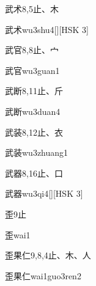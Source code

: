 \begin{entry}{武术}{8,5}{⽌、⽊}
  \begin{phonetics}{武术}{wu3shu4}[][HSK 3]
  \end{phonetics}
\end{entry}

\begin{entry}{武官}{8,8}{⽌、⼧}
  \begin{phonetics}{武官}{wu3guan1}
  \end{phonetics}
\end{entry}

\begin{entry}{武断}{8,11}{⽌、⽄}
  \begin{phonetics}{武断}{wu3duan4}
  \end{phonetics}
\end{entry}

\begin{entry}{武装}{8,12}{⽌、⾐}
  \begin{phonetics}{武装}{wu3zhuang1}
  \end{phonetics}
\end{entry}

\begin{entry}{武器}{8,16}{⽌、⼝}
  \begin{phonetics}{武器}{wu3qi4}[][HSK 3]
  \end{phonetics}
\end{entry}

\begin{entry}{歪}{9}{⽌}
  \begin{phonetics}{歪}{wai1}
  \end{phonetics}
\end{entry}

\begin{entry}{歪果仁}{9,8,4}{⽌、⽊、⼈}
  \begin{phonetics}{歪果仁}{wai1guo3ren2}
  \end{phonetics}
\end{entry}


